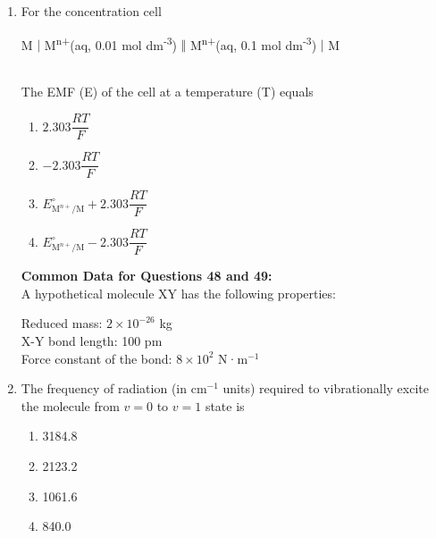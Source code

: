 \documentclass[journal,12pt,onecolumn]{IEEEtran}
\theoremstyle{remark}
\begin{document}
\begin{enumerate}
 

\item    \hspace{0.5cm} For the concentration cell\\
\centerline{M $\vert$ M\textsuperscript{n+}(aq, 0.01 mol dm\textsuperscript{-3}) $\Vert$ M\textsuperscript{n+}(aq, 0.1 mol dm\textsuperscript{-3}) $\vert$ M}\\
The EMF (E) of the cell at a temperature (T) equals  \hfill{}

\begin{multicols}{2}
\begin{enumerate}
    \item \(2.303 \dfrac{RT}{F}\)
    \item \(-2.303 \dfrac{RT}{F}\)
    \item \(E^\circ_{\text{M}^{n+}/\text{M}} + 2.303 \dfrac{RT}{F}\)
    \item \(E^\circ_{\text{M}^{n+}/\text{M}} - 2.303 \dfrac{RT}{F}\)
\end{enumerate}
\end{multicols}

 

\noindent\textbf{Common Data for Questions 48 and 49:}\\
A hypothetical molecule XY has the following properties:

Reduced mass: \(2 \times 10^{-26}\) kg\\
X-Y bond length: 100 pm\\
Force constant of the bond: \(8 \times 10^2\) N·m\(^{-1}\)

 

\item    \hspace{0.5cm} The frequency of radiation (in cm\(^{-1}\) units) required to vibrationally excite the molecule from \(v = 0\) to \(v = 1\) state is  \hfill{}

\begin{multicols}{2}
\begin{enumerate}
    \item 3184.8
    \item 2123.2
    \item 1061.6
    \item 840.0
\end{enumerate}
\end{multicols}

 

\newpage
\


\end{enumerate}
\end{document}
